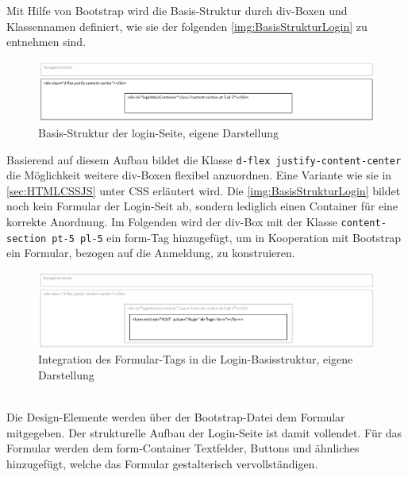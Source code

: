 \documentclass[a4paper,titlepage,halfparskip,12pt]{scrreprt}
\begin{document}
\begin{onehalfspacing}
\pagebreak

Mit Hilfe von Bootstrap wird die Basis-Struktur durch div-Boxen und Klassennamen definiert, wie sie der folgenden \autoref{img:BasisStrukturLogin} zu entnehmen sind.
\begin{figure}[h]
	\centering
	\includegraphics[width=\linewidth]{images/loginBasisStruktur}
	\caption{Basis-Struktur der login-Seite, eigene Darstellung}
	\label{img:BasisStrukturLogin}
\end{figure}
Basierend auf diesem Aufbau bildet die Klasse \texttt{d-flex justify-content-center} die Möglichkeit weitere div-Boxen flexibel anzuordnen. Eine Variante wie sie in \autoref{sec:HTMLCSSJS} unter \ac{CSS} erläutert wird. Die \autoref{img:BasisStrukturLogin} bildet noch kein Formular der Login-Seit ab, sondern lediglich einen Container für eine korrekte Anordnung. Im Folgenden wird der div-Box mit der Klasse \texttt{content-section pt-5 pl-5} ein form-Tag hinzugefügt, um in Kooperation mit Bootstrap ein Formular, bezogen auf die Anmeldung, zu konstruieren.
\begin{figure}[h]
	\centering
	\includegraphics[scale=0.55]{images/loginBasisStruktur&FormContainer}
	\caption{Integration des Formular-Tags in die Login-Basisstruktur, eigene Darstellung}
	\label{img:BasisStrukturLoginUnd Formular}
\end{figure}\\
Die Design-Elemente werden über der Bootstrap-Datei dem Formular mitgegeben. Der strukturelle Aufbau der Login-Seite ist damit vollendet. Für das Formular werden dem form-Container Textfelder, Buttons und ähnliches hinzugefügt, welche das Formular gestalterisch vervollständigen.

\pagebreak


\end{onehalfspacing}
\end{document}
